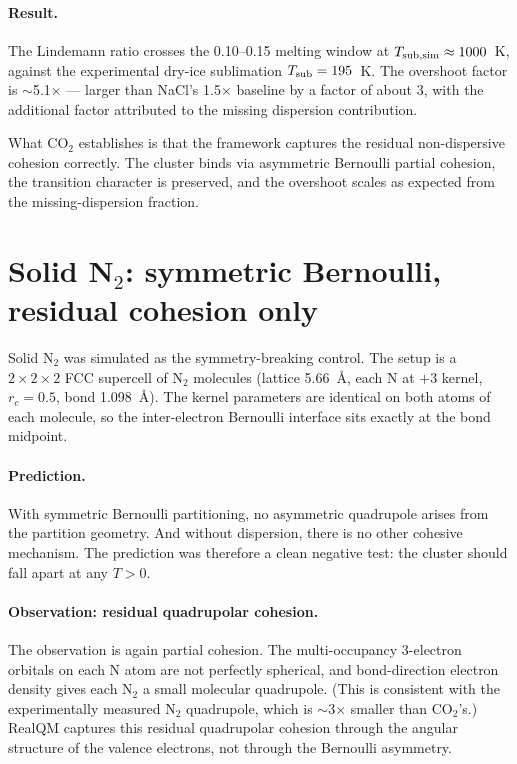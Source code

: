 \paragraph{Result.}
The Lindemann ratio crosses the 0.10--0.15 melting window at $T_{\rm sub,sim} \approx 1000$~K, against the experimental dry-ice sublimation $T_{\rm sub} = 195$~K. The overshoot factor is $\sim$5.1$\times$ --- larger than NaCl's 1.5$\times$ baseline by a factor of about 3, with the additional factor attributed to the missing dispersion contribution.

What CO$_2$ establishes is that the framework captures the residual non-dispersive cohesion correctly. The cluster binds via asymmetric Bernoulli partial cohesion, the transition character is preserved, and the overshoot scales as expected from the missing-dispersion fraction.

\section{Solid N$_2$: symmetric Bernoulli, residual cohesion only}\label{sec:n2}

Solid N$_2$ was simulated as the symmetry-breaking control. The setup is a $2 \times 2 \times 2$ FCC supercell of N$_2$ molecules (lattice 5.66~\AA, each N at $+3$ kernel, $r_c = 0.5$, bond 1.098~\AA). The kernel parameters are identical on both atoms of each molecule, so the inter-electron Bernoulli interface sits exactly at the bond midpoint.

\paragraph{Prediction.}
With symmetric Bernoulli partitioning, no asymmetric quadrupole arises from the partition geometry. And without dispersion, there is no other cohesive mechanism. The prediction was therefore a clean negative test: the cluster should fall apart at any $T > 0$.

\paragraph{Observation: residual quadrupolar cohesion.}
The observation is again partial cohesion. The multi-occupancy 3-electron orbitals on each N atom are not perfectly spherical, and bond-direction electron density gives each N$_2$ a small molecular quadrupole. (This is consistent with the experimentally measured N$_2$ quadrupole, which is $\sim$3$\times$ smaller than CO$_2$'s.) RealQM captures this residual quadrupolar cohesion through the angular structure of the valence electrons, not through the Bernoulli asymmetry.

